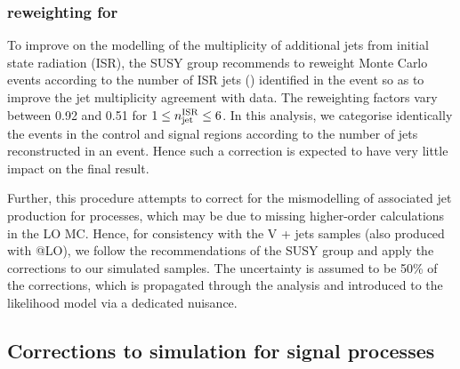 \subsubsection{\texorpdfstring{\nisr}{Nisr} reweighting for \texorpdfstring{\ttbar}{TTbar}}
\label{sec:nisr-intro}
 
To improve on the \MADGRAPH modelling of the multiplicity of
additional jets from initial state radiation (ISR), the SUSY group
recommends to reweight \MADGRAPH \ttbar Monte Carlo events according
to the number of ISR jets (\nisr) identified in the event so as to
improve the jet multiplicity agreement with data. The reweighting
factors vary between 0.92 and 0.51 for $1 \leq n_\textrm{jet}^\mathrm{ISR} \leq 6$. In this
analysis, we categorise identically the events in the control and
signal regions according to the number of jets reconstructed in an
event. Hence such a correction is expected to have very little impact
on the final result.

Further, this procedure attempts to correct for the mismodelling of
associated jet production for \ttbar processes, which may be due to
missing higher-order calculations in the LO \MADGRAPH MC. Hence, for
consistency with the V + jets samples (also produced with
\MADGRAPH{}@LO), we follow the recommendations of the SUSY group and
apply the \nisr corrections to our simulated samples. The uncertainty
is assumed to be 50\% of the corrections, which is propagated through
the analysis and introduced to the likelihood model via a dedicated
nuisance.

\subsection{Corrections to simulation for signal processes}


